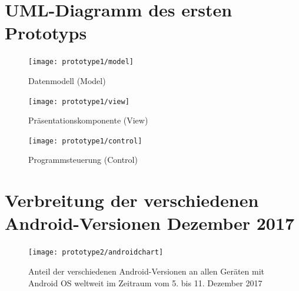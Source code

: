 \chapter{UML-Diagramm des ersten Prototyps}\label{chap:uml}
\begin{figure}[h]
  \centering
  \texttt{[image: prototype1/model]}
  \caption{Datenmodell (Model)}
  \label{fig:model}
\end{figure}

\begin{figure}[h]
  \centering
  \texttt{[image: prototype1/view]}
  \caption{Präsentationskomponente (View)}
  \label{fig:view}
\end{figure}

\begin{figure}[h]
  \centering
  \texttt{[image: prototype1/control]}
  \caption{Programmsteuerung (Control)}
  \label{fig:control}
\end{figure}

\chapter{Verbreitung der verschiedenen Android-Versionen Dezember 2017}
\begin{figure}[h]
  \centering
  \texttt{[image: prototype2/androidchart]}
  \caption{Anteil der verschiedenen Android-Versionen an allen Geräten mit Android OS weltweit im Zeitraum vom 5. bis 11. Dezember 2017}
  \label{fig:versionchart}
\end{figure}


